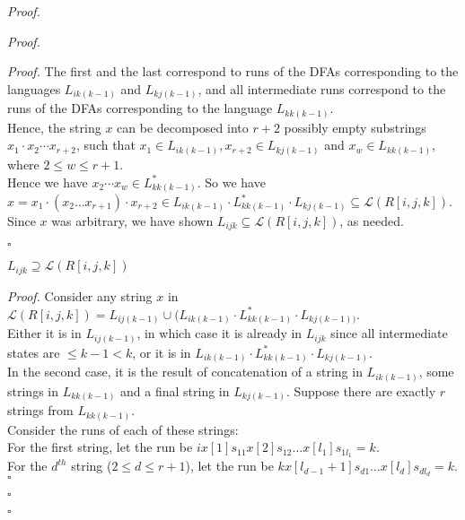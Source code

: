 \documentclass[a4paper]{article}
\newenvironment{proof}{\begin{breakbox}\textit{Proof.}}{\hfill$\square$\end{breakbox}}
\newcommand{\mc}{\mathcal}
\renewcommand{\L}{\mc{L}}
\begin{document}
\begin{proof}
\begin{proof}
\begin{enumerate}
\begin{proof}
				      The first and the last correspond to runs of the DFAs corresponding to the languages $L_{ik(k-1)}$ and $L_{kj(k-1)}$, and all intermediate runs correspond to the runs of the DFAs
				      corresponding to the language $L_{kk(k-1)}$.\\

				      Hence, the string $x$ can be decomposed into $r + 2$ possibly empty substrings $x_1 \cdot x_2 \cdots x_{r+2}$, such that $x_1 \in L_{ik(k-1)}, x_{r+2} \in L_{kj(k-1)}$ and
				      $x_w \in L_{kk(k-1)}$, where $2 \le w \le r + 1$.\\

				      Hence we have $x_2 \cdots x_w \in L_{kk(k-1)}^*$. So we have $x = x_1 \cdot (x_2 \ldots x_{r+1}) \cdot x_{r+2} \in L_{ik(k-1)} \cdot L_{kk(k-1)}^* \cdot L_{kj(k-1)}
					      \subseteq \L(R[i,
						      j, k])$.\\

				      Since $x$ was arbitrary, we have shown $L_{ijk} \subseteq \L(R[i, j, k])$, as needed.

			      \end{proof}
			      \begin{claim}
				      $L_{ijk} \supseteq \L(R[i, j, k])$
			      \end{claim}
			      \begin{proof}
				      Consider any string $x$ in $\L(R[i, j, k]) = L_{ij(k-1)} \cup (L_{ik(k-1)} \cdot L_{kk(k-1)}^* \cdot L_{kj(k-1))}$.\\

				      Either it is in $L_{ij(k-1)}$, in which case it is already in $L_{ijk}$ since all intermediate states are $\le k - 1 < k$, or it is in $L_{ik(k-1)} \cdot L_{kk(k-1)}^* \cdot
					      L_{kj(k-1)}$.\\

				      In the second case, it is the result of concatenation of a string in $L_{ik(k-1)}$, some strings in $L_{kk(k-1)}$ and a final string in $L_{kj(k-1)}$. Suppose there are
				      exactly $r$ strings from $L_{kk(k-1)}$.\\

				      Consider the runs of each of these strings:\\

				      For the first string, let the run be $i x[1] s_{11} x[2] s_{12} \ldots x[l_1] s_{1l_1} = k$.\\

				      For the $d^{th}$ string ($2 \le d \le r + 1$), let the run be $k x[l_{d-1} + 1] s_{d1} \ldots x[l_d] s_{dl_d} = k$.\\


\end{proof}
\end{enumerate}
\end{proof}
\end{proof}
\end{document}
